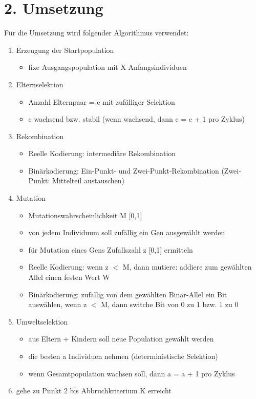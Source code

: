 \documentclass[12pt,
    a4paper,
    headinclude,
    footinclude]{scrreprt}
\begin{document}
\section*{2. Umsetzung}


Für die Umsetzung wird folgender Algorithmus verwendet:

\begin{enumerate}
	\item Erzeugung der Startpopulation 
	\begin{itemize}
		\item fixe Ausgangspopulation mit X Anfangsindividuen
	\end{itemize}
	\item Elternselektion
		\begin{itemize}
		\item Anzahl Elternpaar = e mit zufälliger Selektion
		\item e wachsend bzw. stabil (wenn wachsend, dann e = e + 1 pro Zyklus)
	\end{itemize}
	\item Rekombination
		\begin{itemize}
		\item Reelle Kodierung: intermediäre Rekombination
		\item Binärkodierung: Ein-Punkt- und Zwei-Punkt-Rekombination (Zwei-Punkt: Mittelteil austauschen)
	\end{itemize}
	\item Mutation
		\begin{itemize}
		\item Mutationswahrscheinlichkeit M [0,1]
		\item von jedem Individuum soll zufällig ein Gen ausgewählt werden
		\item für Mutation eines Gens Zufallszahl z [0,1] ermitteln
		\item Reelle Kodierung: wenn z $<$ M, dann mutiere: addiere zum gewählten Allel einen festen Wert W
		\item Binärkodierung: zufällig von dem gewählten Binär-Allel ein Bit auswählen, wenn z $<$ M, dann switche Bit von 0 zu 1 bzw. 1 zu 0
	\end{itemize} 
	\item Umweltselektion
		\begin{itemize}
		\item aus Eltern + Kindern soll neue Population gewählt werden 
		\item die besten a Individuen nehmen (deterministische Selektion) \item wenn Gesamtpopulation wachsen soll, dann a = a + 1 pro Zyklus
	\end{itemize}
	\item gehe zu Punkt 2 bis Abbruchkriterium K erreicht
\end{enumerate}
\end{document}
